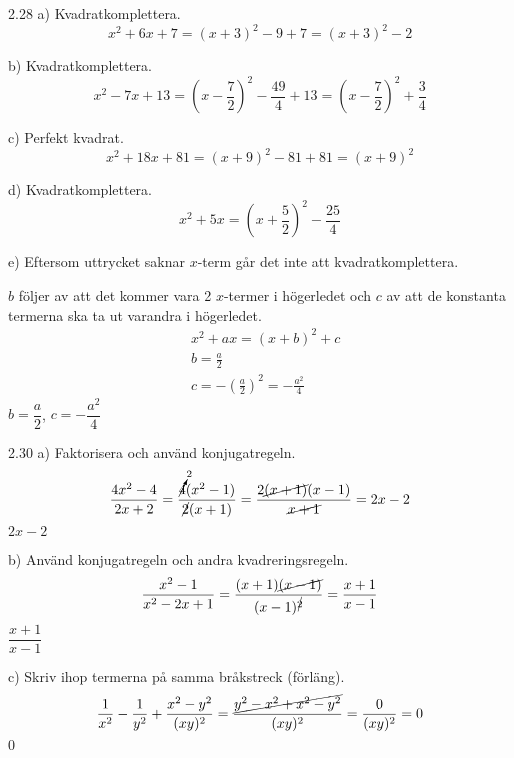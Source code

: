 \begin{task}{2.28 a)}
	Kvadratkomplettera.
	\[x^2+6x+7=(x+3)^2-9+7=(x+3)^2-2\]
\end{task}

\begin{task}{b)}
	Kvadratkomplettera.
	\[x^2-7x+13=(x-\frac{7}{2})^2-\frac{49}{4}+13=(x-\frac{7}{2})^2+\frac{3}{4}\]
\end{task}

\begin{task}{c)}
	Perfekt kvadrat.
	\[x^2+18x+81=(x+9)^2-81+81=(x+9)^2\]
\end{task}

\begin{task}{d)}
	Kvadratkomplettera.
	\[x^2+5x=(x+\frac{5}{2})^2-\frac{25}{4}\]
\end{task}

\begin{task}{e)}
	Eftersom uttrycket saknar $x$-term går det inte att kvadratkomplettera.
\end{task}

\begin{task}{2.29}
	$b$ följer av att det kommer vara 2 $x$-termer i högerledet och $c$ av att de konstanta termerna ska ta ut varandra i högerledet.
	\begin{align*}
	& x^2+ax=(x+b)^2+c \\
	& b=\frac{a}{2} \\
	& c=-\left(\frac{a}{2}\right)^2=-\frac{a^2}{4}
	\end{align*}
	\ans $b=\dfrac{a}{2}$, $c=-\dfrac{a^2}{4}$
\end{task}

\begin{task}{2.30 a)}
	Faktorisera och använd konjugatregeln.
	\[\dfrac{4x^2-4}{2x+2}=
	\dfrac{\cancelto{2}{4}(x^2-1)}{\cancel{2}(x+1)}=
	\dfrac{2\cancel{(x+1)}(x-1)}{\cancel{x+1}}=
	2x-2\]
	\ans $2x-2$
\end{task}

\begin{task}{b)}
	Använd konjugatregeln och andra kvadreringsregeln.
	\[\dfrac{x^2-1}{x^2-2x+1}=
	\dfrac{(x+1)\cancel{(x-1)}}{(x-1)^{\cancel{2}}}=
	\dfrac{x+1}{x-1}\]
	\ans $\dfrac{x+1}{x-1}$
\end{task}

\begin{task}{c)}
	Skriv ihop termerna på samma bråkstreck (förläng).
	\[\frac{1}{x^2}-\frac{1}{y^2}+\frac{x^2-y^2}{(xy)^2}=
	\frac{\cancel{y^2-x^2+x^2-y^2}}{(xy)^2}=
	\frac{0}{(xy)^2}=
	0\]
	\ans $0$
\end{task}

